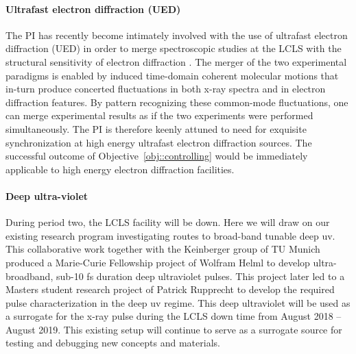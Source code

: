 \documentclass[letterpaper,oneside,11pt]{article}
\begin{document}
\paragraph*{Ultrafast electron diffraction (UED)}
The PI has recently become intimately involved with the use of ultrafast electron diffraction (UED) in order to merge spectroscopic studies at the LCLS with the structural sensitivity of electron diffraction \cite{ued_rsi2015,Jie2016}.
The merger of the two experimental paradigms is enabled by induced time-domain coherent molecular motions that in-turn produce concerted fluctuations in both x-ray spectra and in electron diffraction features.
By pattern recognizing these common-mode fluctuations, one can merge experimental results as if the two experiments were performed simultaneously.
The PI is therefore keenly attuned to need for exquisite synchronization at high energy ultrafast electron diffraction sources.
The successful outcome of Objective~\ref{obj::controlling} would be immediately applicable to high energy electron diffraction facilities.%


\paragraph*{Deep ultra-violet}
During period two, the LCLS facility will be down.
Here we will draw on our existing research program investigating routes to broad-band tunable deep uv.
This collaborative work together with the Keinberger group of TU Munich produced a Marie-Curie Fellowship project of Wolfram Helml to develop ultra-broadband, sub-10 fs duration deep ultraviolet pulses.
This project later led to a Masters student research project of Patrick Rupprecht to develop the required pulse characterization in the deep uv regime.
This deep ultraviolet will be used as a surrogate for the x-ray pulse during the LCLS down time from August 2018 -- August 2019.
This existing setup will continue to serve as a surrogate source for testing and debugging new concepts and materials. 

\end{document}
